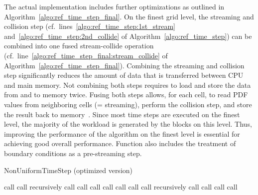 \documentclass[final,leqno,onefignum,onetabnum]{siamltex1213}
\begin{document}
The actual implementation includes further optimizations as outlined in Algorithm~\ref{algo:ref_time_step_final}.
On the finest grid level, the streaming and collision step (cf.\ lines~\ref{algo:ref_time_step:1st_stream} and~\ref{algo:ref_time_step:2nd_collide} of
Algorithm~\ref{algo:ref_time_step}) can be combined into one fused stream-collide operation (cf.\ line~\ref{algo:ref_time_step_final:stream_collide} of Algorithm~\ref{algo:ref_time_step_final}).
Combining the streaming and collision step significantly reduces the amount of data that is transferred between CPU and main memory.
Not combining both steps requires to load and store the data from and to memory twice.
Fusing both steps allows, for each cell, to read PDF values from neighboring cells (= streaming),
perform the collision step, and store the result back to memory~\cite{CPE:CPE3180}.
Since most time steps are executed on the finest level, the majority of the workload is generated by the blocks on this level.
Thus, improving the performance of the algorithm on the finest level is essential for achieving good overall performance.
Function  also includes the treatment of boundary conditions as a pre-streaming step.

\begin{algorithm}[tbp]
\footnotesize
\caption{NonUniformTimeStep (optimized version)}
\label{algo:ref_time_step_final}
\DontPrintSemicolon
{}
{
\If{}
{
call \StartExplosion{}
}
call \StartCommunication{}\;\label{algo:ref_time_step_final:1st_start_comm}
\If{}
{
recursively call \RefStep{}\label{algo:ref_time_step_final:1st_rec_call}
call \StartCoalescence{}\;
}
\If{}
{
call \EndExplosion{}\;\label{algo:ref_time_step_final:end_explosion}
call \Interpolation{}\label{algo:ref_time_step_final:interpolation}
}
call \EndCommunication{}\;\label{algo:ref_time_step_final:1st_end_comm}
\eIf{ \and }
{
\label{algo:ref_time_step_final:stream_collide}
}
{
\If{}
{
call \EndCoalescence{}
}
\If{}
{
\Return
}
}
call \StartCommunication{}\;
\If{}
{
recursively call \RefStep{}
call \StartCoalescence{}\;
}
call \EndCommunication{}\;
\If{}
{
call \EndCoalescence{}
}
}
\end{algorithm}
\end{document}
